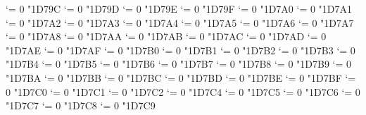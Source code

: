 {  \Umathcode `\Ν = 0 \unimathfam "1D79C
  \Umathcode `\Ξ = 0 \unimathfam "1D79D
  \Umathcode `\Ο = 0 \unimathfam "1D79E
  \Umathcode `\Π = 0 \unimathfam "1D79F
  \Umathcode `\Ρ = 0 \unimathfam "1D7A0
  \Umathcode `\ϴ = 0 \unimathfam "1D7A1
  \Umathcode `\Σ = 0 \unimathfam "1D7A2
  \Umathcode `\Τ = 0 \unimathfam "1D7A3
  \Umathcode `\Υ = 0 \unimathfam "1D7A4
  \Umathcode `\Φ = 0 \unimathfam "1D7A5
  \Umathcode `\Χ = 0 \unimathfam "1D7A6
  \Umathcode `\Ψ = 0 \unimathfam "1D7A7
  \Umathcode `\Ω = 0 \unimathfam "1D7A8
  \Umathcode `\α = 0 \unimathfam "1D7AA
  \Umathcode `\β = 0 \unimathfam "1D7AB
  \Umathcode `\γ = 0 \unimathfam "1D7AC
  \Umathcode `\δ = 0 \unimathfam "1D7AD
  \Umathcode `\ε = 0 \unimathfam "1D7AE
  \Umathcode `\ζ = 0 \unimathfam "1D7AF
  \Umathcode `\η = 0 \unimathfam "1D7B0
  \Umathcode `\θ = 0 \unimathfam "1D7B1
  \Umathcode `\ι = 0 \unimathfam "1D7B2
  \Umathcode `\κ = 0 \unimathfam "1D7B3
  \Umathcode `\λ = 0 \unimathfam "1D7B4
  \Umathcode `\μ = 0 \unimathfam "1D7B5
  \Umathcode `\ν = 0 \unimathfam "1D7B6
  \Umathcode `\ξ = 0 \unimathfam "1D7B7
  \Umathcode `\ο = 0 \unimathfam "1D7B8
  \Umathcode `\π = 0 \unimathfam "1D7B9
  \Umathcode `\ρ = 0 \unimathfam "1D7BA
  \Umathcode `\ς = 0 \unimathfam "1D7BB
  \Umathcode `\σ = 0 \unimathfam "1D7BC
  \Umathcode `\τ = 0 \unimathfam "1D7BD
  \Umathcode `\υ = 0 \unimathfam "1D7BE
  \Umathcode `\ϕ = 0 \unimathfam "1D7BF
  \Umathcode `\χ = 0 \unimathfam "1D7C0
  \Umathcode `\ψ = 0 \unimathfam "1D7C1
  \Umathcode `\ω = 0 \unimathfam "1D7C2
  \Umathcode `\ϵ = 0 \unimathfam "1D7C4
  \Umathcode `\ϑ = 0 \unimathfam "1D7C5
  \Umathcode `\ϰ = 0 \unimathfam "1D7C6
  \Umathcode `\φ = 0 \unimathfam "1D7C7
  \Umathcode `\ϱ = 0 \unimathfam "1D7C8
  \Umathcode `\ϖ = 0 \unimathfam "1D7C9
\tensfbfit}
\let\sfitbf=\sfbfit
\let\bfsfit=\sfbfit
\let\bfitsf=\sfbfit
\let\itsfbf=\sfbfit
\let\itbfsf=\sfbfit

